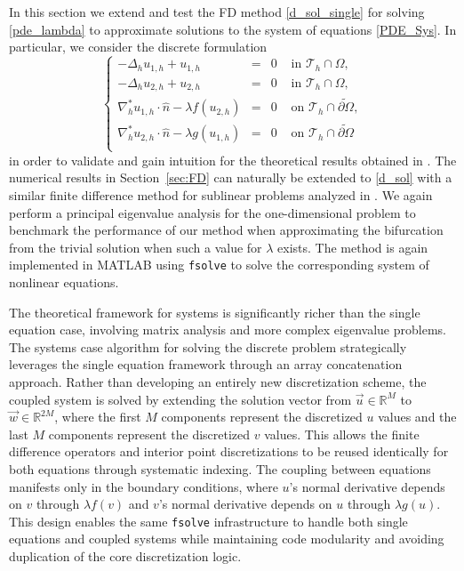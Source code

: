 \documentclass[12pt, reqno]{amsart}
\numberwithin{equation}{section}
\begin{document}
In this section we extend and test the FD method \eqref{d_sol_single} for solving \eqref{pde_lambda} to approximate 
solutions to the system of equations \eqref{PDE_Sys}.  In particular, we consider the discrete formulation 
\begin{equation}\label{d_sol}
    \left\lbrace\begin{array}{rcll}
    -\Delta_{h} u_{1,h}+ u_{1,h}&=&0 & \mbox{ in } \mathcal{T}_h \cap \Omega, \\
    -\Delta_h u_{2,h}+ u_{2,h} &=&0 & \mbox{ in } \mathcal{T}_h \cap \Omega,\\
    \nabla_h^* u_{1,h}  \cdot \widehat{n} - \lambda f( u_{2,h}  ) &=& 0 & \mbox{ on } \mathcal{T}_h \cap \widetilde{\partial \Omega},\\
   \nabla_h^* u_{2,h}  \cdot \widehat{n} - \lambda g(u_{1,h} ) &=& 0 & \mbox{ on } \mathcal{T}_h \cap \widetilde{\partial \Omega}\\
    \end{array}\right.
\end{equation}
in order to validate and gain intuition for the theoretical results obtained in \cite{BCDMP_Systems}.  
The numerical results in Section~\ref{sec:FD} can naturally be extended to \eqref{d_sol} with 
a similar finite difference method for sublinear problems analyzed in \cite{BLM_2025}.  
We again perform a principal eigenvalue analysis for the one-dimensional problem to benchmark the performance of our method when approximating the bifurcation from the trivial solution when such a value for $\lambda$ exists.  
The method is again implemented in MATLAB using \texttt{fsolve} to solve the corresponding system of nonlinear equations.  

The theoretical framework for systems is significantly richer than the single equation case, involving matrix analysis and more complex eigenvalue problems. The systems case algorithm for solving the discrete problem strategically leverages the single equation framework through an array concatenation approach. Rather than developing an entirely new discretization scheme, the coupled system is solved by extending the solution vector from $\vec{u} \in \mathbb{R}^M$ to $\vec{w} \in \mathbb{R}^{2M}$, where the first $M$ components represent the discretized $u$ values and the last $M$ components represent the discretized $v$ values. This allows the finite difference operators and interior point discretizations to be reused identically for both equations through systematic indexing. The coupling between equations manifests only in the boundary conditions, where $u$'s normal derivative depends on $v$ through $\lambda f(v)$ and $v$'s normal derivative depends on $u$ through $\lambda g(u)$. This design enables the same \texttt{fsolve} infrastructure to handle both single equations and coupled systems while maintaining code modularity and avoiding duplication of the core discretization logic.
\end{document}
